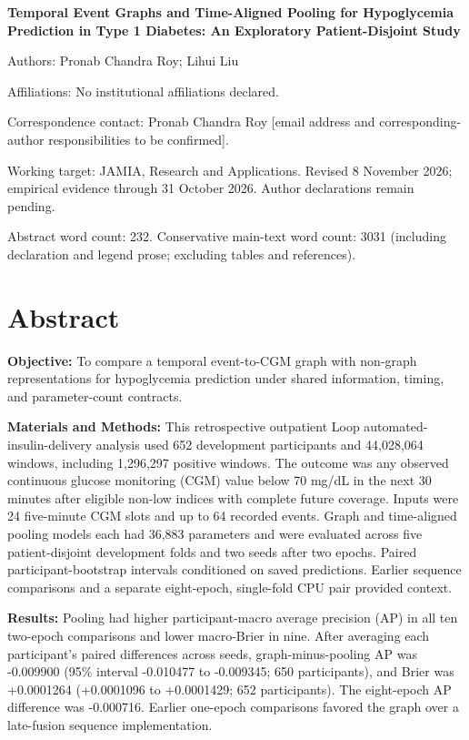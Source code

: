 \documentclass[11pt,a4paper]{article}
\begin{document}
{\raggedright{}\LARGE\bfseries Temporal Event Graphs and Time-Aligned Pooling for Hypoglycemia Prediction in Type 1 Diabetes: An Exploratory Patient-Disjoint Study\par}
\vspace{8pt}
Authors: Pronab Chandra Roy; Lihui Liu

Affiliations: No institutional affiliations declared.

Correspondence contact: Pronab Chandra Roy [email address and corresponding-author responsibilities to be confirmed].

Working target: JAMIA, Research and Applications. Revised 8 November 2026; empirical evidence through 31 October 2026. Author declarations remain pending.

Abstract word count: 232. Conservative main-text word count: 3031 (including declaration and legend prose; excluding tables and references).

\clearpage
\section*{Abstract}
\textbf{Objective:} To compare a temporal event-to-CGM graph with non-graph representations for hypoglycemia prediction under shared information, timing, and parameter-count contracts.

\textbf{Materials and Methods:} This retrospective outpatient Loop automated-insulin-delivery analysis used 652 development participants and 44,028,064 windows, including 1,296,297 positive windows. The outcome was any observed continuous glucose monitoring (CGM) value below 70 mg/dL in the next 30 minutes after eligible non-low indices with complete future coverage. Inputs were 24 five-minute CGM slots and up to 64 recorded events. Graph and time-aligned pooling models each had 36,883 parameters and were evaluated across five patient-disjoint development folds and two seeds after two epochs. Paired participant-bootstrap intervals conditioned on saved predictions. Earlier sequence comparisons and a separate eight-epoch, single-fold CPU pair provided context.

\textbf{Results:} Pooling had higher participant-macro average precision (AP) in all ten two-epoch comparisons and lower macro-Brier in nine. After averaging each participant's paired differences across seeds, graph-minus-pooling AP was -0.009900 (95\% interval -0.010477 to -0.009345; 650 participants), and Brier was +0.0001264 (+0.0001096 to +0.0001429; 652 participants). The eight-epoch AP difference was -0.000716. Earlier one-epoch comparisons favored the graph over a late-fusion sequence implementation.
\end{document}
